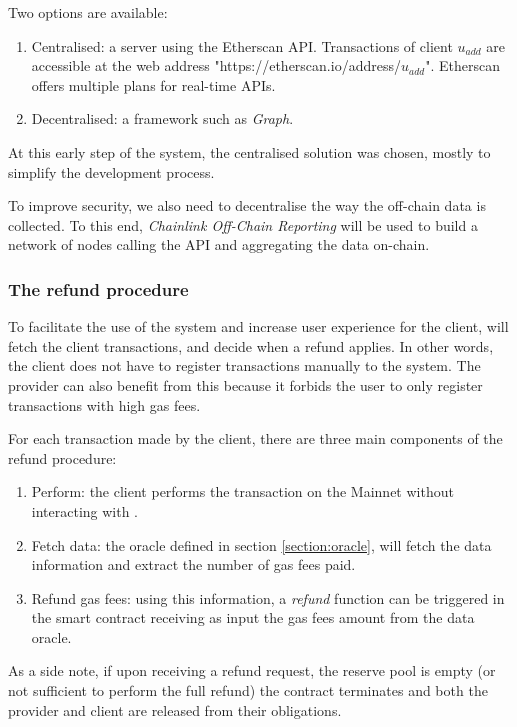Two options are available:

\begin{enumerate}
    \item Centralised: a server using the Etherscan API\cite{EtherscanAPIs}. Transactions of client $u_{add}$ are accessible at the web address "https://etherscan.io/address/$u_{add}$". Etherscan offers multiple plans for real-time APIs.
    \item Decentralised: a framework such as \textit{Graph}.
\end{enumerate}
At this early step of the system, the centralised solution was chosen, mostly to simplify the development process.

To improve security, we also need to decentralise the way the off-chain data is collected. To this end, \textit{Chainlink Off-Chain Reporting}\cite{ChainlinkAchievesMajor2021} will be used to build a network of nodes calling the API and aggregating the data on-chain.

\subsubsection{The refund procedure}

To facilitate the use of the system and increase user experience for the client, {\projectName} will fetch the client transactions,  and decide when a refund applies. In other words, the client does not have to register transactions manually to the system. The provider can also benefit from this because it forbids the user to only register transactions with high gas fees. 

For each transaction made by the client, there are three main components of the refund procedure:
\begin{enumerate}
    \item Perform: the client performs the transaction on the Mainnet without interacting with {\projectName}.
    \item Fetch data: the oracle defined in section \ref{section:oracle}, will fetch the data information and extract the number of gas fees paid. 
    \item Refund gas fees: using this information, a \textit{refund} function can be triggered in the smart contract receiving as input the gas fees amount from the data oracle.  
\end{enumerate}

As a side note, if upon receiving a refund request, the reserve pool is empty (or not sufficient to perform the full refund) the contract terminates and both the provider and client are released from their obligations.

